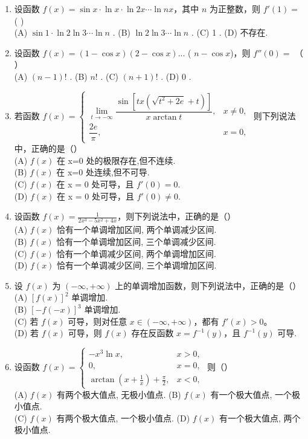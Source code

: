 \documentclass[12pt, a4paper]{ctexart}
\begin{document}
\begin{enumerate}
    \item 设函数 $ f(x) = \sin x \cdot \ln x \cdot \ln 2x \cdots \ln nx $，其中 $ n $ 为正整数，则 $ f'(1) = $ ( )\\
    (A) $ \sin 1 \cdot \ln 2 \ln 3 \cdots \ln n $ . (B) $ \ln 2 \ln 3 \cdots \ln n $ . (C) 1 . (D) 不存在.

    \item 设函数 $ f(x) = (1 - \cos x)(2 - \cos x) $... ( $ n - \cos x $)，则 $ f''(0) = $ （ ）\\
    (A) $ (n - 1)! $ . \quad (B) $ n! $ . \quad (C) $ (n + 1)! $ . \quad (D) 0 .

    \item 若函数 $ f(x)=\begin{cases}\lim\limits_{t\to-\infty}\dfrac{\sin\left[tx\left(\sqrt{t^{2}+2e}+t\right)\right]}{x\arctan t},&x\neq0,\\\dfrac{2e}{\pi},&x=0,\end{cases} $ 则下列说法中，正确的是（）\\
    (A) $ f(x) $ 在 x=0 处的极限存在,但不连续.\\
    (B) $ f(x) $ 在 x=0 处连续,但不可导.\\
    (C) $ f(x) $ 在 x = 0 处可导，且 $ f'(0) = 0 $.\\
    (D) $ f(x) $ 在 x = 0 处可导，且 $ f'(0) \neq 0 $.

    \item 设函数 $ f(x)=\frac{1}{2x^{3}-5x^{2}+4x} $，则下列说法中，正确的是（）\\
    (A) $ f(x) $ 恰有一个单调增加区间, 两个单调减少区间.\\
    (B) $ f(x) $ 恰有一个单调增加区间, 三个单调减少区间.\\
    (C) $ f(x) $ 恰有一个单调减少区间, 两个单调增加区间.\\
    (D) $ f(x) $ 恰有一个单调减少区间, 三个单调增加区间.

    \item 设 $ f(x) $ 为 $ (-\infty, +\infty) $ 上的单调增加函数，则下列说法中，正确的是（）\\
    (A) $ \left[f(x)\right]^{2} $ 单调增加.\\
    (B) $ \left[-f(-x)\right]^{3} $ 单调增加.\\
    (C) 若 $ f(x) $ 可导，则对任意 $ x \in (-\infty, +\infty) $，都有 $ f'(x) > 0 $。\\
    (D) 若 $ f(x) $ 可导，则 $ f(x) $ 存在反函数 $ x = f^{-1}(y) $，且 $ f^{-1}(y) $ 可导.

    \item 设函数 $ f(x)=\begin{cases}-x^{3}\ln x,&x>0,\\0,&x=0,\\\arctan\left(x+\frac{1}{x}\right)+\frac{\pi}{2},&x<0,\end{cases} $ 则（）\\
    (A) $ f(x) $ 有两个极大值点, 无极小值点. (B) $ f(x) $ 有一个极大值点, 一个极小值点.\\
    (C) $ f(x) $ 有两个极大值点, 一个极小值点. (D) $ f(x) $ 有一个极大值点, 两个极小值点.


\end{enumerate}
\end{document}
